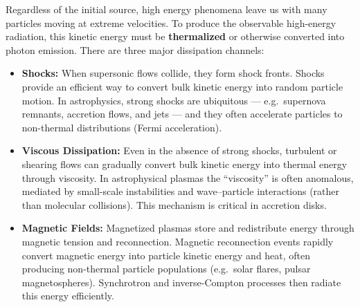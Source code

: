 Regardless of the initial source, high energy phenomena leave us with many particles moving at extreme velocities. To produce the observable high-energy radiation, this kinetic energy must be \textbf{thermalized} or otherwise converted into photon emission. There are three major dissipation channels:

\begin{itemize}
    \item \textbf{Shocks:}  
    When supersonic flows collide, they form shock fronts. Shocks provide an efficient way to convert bulk kinetic energy into random particle motion. In astrophysics, strong shocks are ubiquitous --- e.g.\ supernova remnants, accretion flows, and jets --- and they often accelerate particles to non-thermal distributions (Fermi acceleration).

    \item \textbf{Viscous Dissipation:}  
    Even in the absence of strong shocks, turbulent or shearing flows can gradually convert bulk kinetic energy into thermal energy through viscosity. In astrophysical plasmas the ``viscosity'' is often anomalous, mediated by small-scale instabilities and wave–particle interactions (rather than molecular collisions). This mechanism is critical in accretion disks.

    \item \textbf{Magnetic Fields:}  
    Magnetized plasmas store and redistribute energy through magnetic tension and reconnection. Magnetic reconnection events rapidly convert magnetic energy into particle kinetic energy and heat, often producing non-thermal particle populations (e.g.\ solar flares, pulsar magnetospheres). Synchrotron and inverse-Compton processes then radiate this energy efficiently.
\end{itemize}
